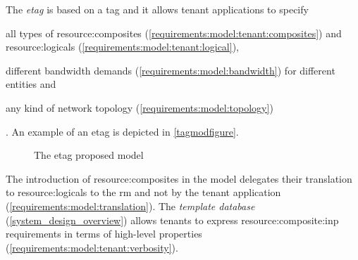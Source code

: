 The \textit{\gls{etag}} is based on a \gls{tag} and it allows tenant applications to specify
\begin{mylist}
    \item all types of \glspl{resource:composite} (\cmark \ref{requirements:model:tenant:composites}) and \glspl{resource:logical} (\cmark \ref{requirements:model:tenant:logical}),
    \item different bandwidth demands (\cmark \ref{requirements:model:bandwidth}) for different entities and
    \item any kind of network topology (\cmark \ref{requirements:model:topology})
\end{mylist}.
An example of an \gls{etag} is depicted in \autoref{tagmodfigure}.

\begin{figure}[!htb]
    \centering
    \usebox{\tagmodfigure}
    \caption{The \gls{etag} proposed model}
    \label{tagmodfigure}
\end{figure}

The introduction of \glspl{resource:composite} in the model delegates their translation to \glspl{resource:logical} to the \gls{rm} and not by the tenant application (\cmark \ref{requirements:model:translation}).
The \textit{template database} (\autoref{system_design_overview}) allows tenants to express \gls{resource:composite:inp} requirements in terms of high-level properties (\cmark \ref{requirements:model:tenant:verbosity}).